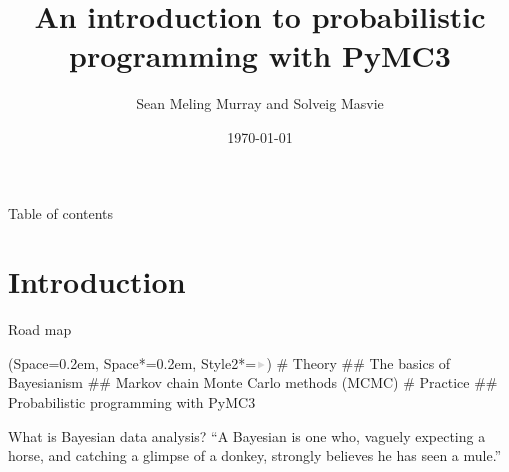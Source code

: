 \documentclass[12pt, aspectratio=149]{beamer}
\title{An introduction to probabilistic programming with PyMC3}
\date{\today}
\author{Sean Meling Murray and Solveig Masvie}
\newcommand{\listSpace}{0.2em}
\theoremstyle{plain}
\begin{document}
\maketitle
{}
  
\begin{frame}{Table of contents}
	\tableofcontents
\end{frame}

\section{Introduction}
\begin{frame}[fragile]{Road map}
	\begin{easylist}[itemize]
		\ListProperties(Space=\listSpace, Space*=\listSpace, Style2*=$\color{bggraydark}\blacktriangleright$\space)
		# Theory
		## The basics of Bayesianism
		## Markov chain Monte Carlo methods (MCMC)
		# Practice
		## Probabilistic programming with PyMC3
	\end{easylist}
\end{frame}

\begin{frame}[fragile]{What is Bayesian data analysis?}
	``A Bayesian is one who, vaguely expecting a horse, and catching a glimpse of a donkey, strongly believes he has seen a mule.''
\end{frame}
\end{document}
